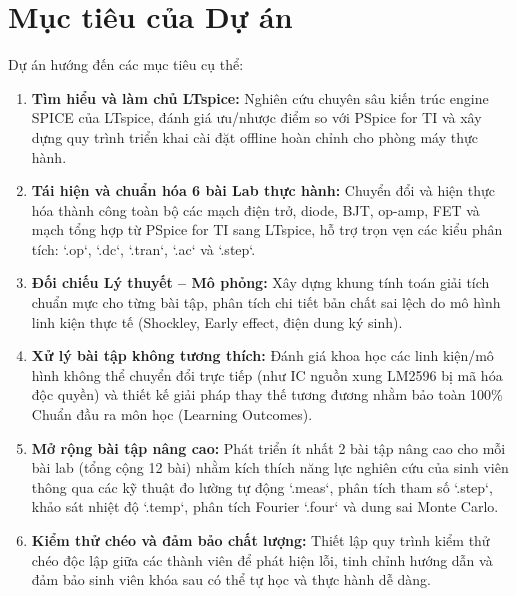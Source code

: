 \documentclass[12pt,a4paper]{report}
\begin{document}
\section{Mục tiêu của Dự án}
Dự án hướng đến các mục tiêu cụ thể:
\begin{enumerate}
    \item \textbf{Tìm hiểu và làm chủ LTspice:} Nghiên cứu chuyên sâu kiến trúc engine SPICE của LTspice, đánh giá ưu/nhược điểm so với PSpice for TI và xây dựng quy trình triển khai cài đặt offline hoàn chỉnh cho phòng máy thực hành.
    \item \textbf{Tái hiện và chuẩn hóa 6 bài Lab thực hành:} Chuyển đổi và hiện thực hóa thành công toàn bộ các mạch điện trở, diode, BJT, op-amp, FET và mạch tổng hợp từ PSpice for TI sang LTspice, hỗ trợ trọn vẹn các kiểu phân tích: `.op`, `.dc`, `.tran`, `.ac` và `.step`.
    \item \textbf{Đối chiếu Lý thuyết -- Mô phỏng:} Xây dựng khung tính toán giải tích chuẩn mực cho từng bài tập, phân tích chi tiết bản chất sai lệch do mô hình linh kiện thực tế (Shockley, Early effect, điện dung ký sinh).
    \item \textbf{Xử lý bài tập không tương thích:} Đánh giá khoa học các linh kiện/mô hình không thể chuyển đổi trực tiếp (như IC nguồn xung LM2596 bị mã hóa độc quyền) và thiết kế giải pháp thay thế tương đương nhằm bảo toàn 100\% Chuẩn đầu ra môn học (Learning Outcomes).
    \item \textbf{Mở rộng bài tập nâng cao:} Phát triển ít nhất 2 bài tập nâng cao cho mỗi bài lab (tổng cộng 12 bài) nhằm kích thích năng lực nghiên cứu của sinh viên thông qua các kỹ thuật đo lường tự động `.meas`, phân tích tham số `.step`, khảo sát nhiệt độ `.temp`, phân tích Fourier `.four` và dung sai Monte Carlo.
    \item \textbf{Kiểm thử chéo và đảm bảo chất lượng:} Thiết lập quy trình kiểm thử chéo độc lập giữa các thành viên để phát hiện lỗi, tinh chỉnh hướng dẫn và đảm bảo sinh viên khóa sau có thể tự học và thực hành dễ dàng.
\end{enumerate}
\end{document}
